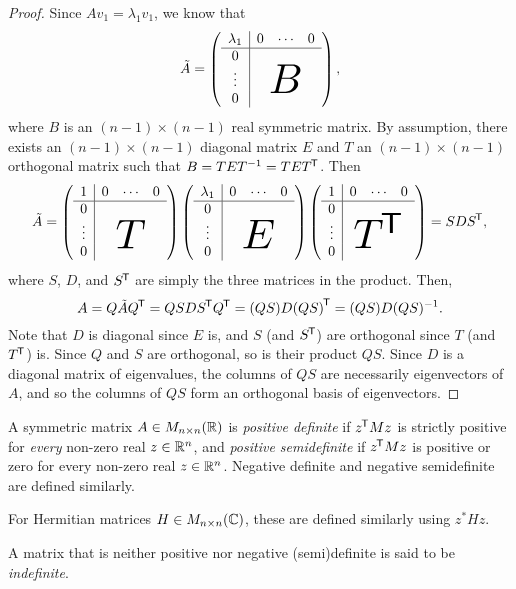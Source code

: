 \begin{proof}
    Since $Av_1 = \lambda_1v_1$, we know that
    \[\tilde{A} = \left(\begin{array}{c|ccc}
        \lambda_1 & 0 & \cdots & 0 \\
        \hline
        0 & & & \\
        \vdots & & & \\
        0 & \largeblock{3}{2.2}{$B$}
    \end{array}\right),\]
    where $B$ is an $(n-1)\times(n-1)$ real symmetric matrix. By assumption, there exists an $(n-1)\times(n-1)$ diagonal matrix $E$ and $T$ an $(n-1)\times(n-1)$ orthogonal matrix such that $B = TET^{-1} = TE{T}^{\mkern-1.5mu\mathsf{T}}$. Then
    \[\tilde{A} = \left(\begin{array}{c|ccc}
        1 & 0 & \cdots & 0 \\
        \hline
        0 & & & \\
        \vdots & & & \\
        0 & \largeblock{3}{2.0}{$T$}
    \end{array}\right)
    \left(\begin{array}{c|ccc}
        \lambda_1 & 0 & \cdots & 0 \\
        \hline
        0 & & & \\
        \vdots & & & \\
        0 & \largeblock{3}{2.0}{$E$}
    \end{array}\right)
    \left(\begin{array}{c|ccc}
        1 & 0 & \cdots & 0 \\
        \hline
        0 & & & \\
        \vdots & & & \\
        0 & \largeblock{3}{2.7}{$\transposeof{T}$}
    \end{array}\right) = SD\transposeof{S},\]
    where $S$, $D$, and ${S}^{\mkern-1.5mu\mathsf{T}}$ are simply the three matrices in the product. Then,
    \[A = Q\tilde{A}{Q}^{\mkern-1.5mu\mathsf{T}} = QSD{S}^{\mkern-1.5mu\mathsf{T}}{Q}^{\mkern-1.5mu\mathsf{T}} = (QS)D{(QS)}^{\mkern-1.5mu\mathsf{T}} = (QS)D(QS)^{-1}.\]
    Note that $D$ is diagonal since $E$ is, and $S$ (and ${S}^{\mkern-1.5mu\mathsf{T}}$) are orthogonal since $T$ (and ${T}^{\mkern-1.5mu\mathsf{T}}$) is. Since $Q$ and $S$ are orthogonal, so is their product $QS$. Since $D$ is a diagonal matrix of eigenvalues, the columns of $QS$ are necessarily eigenvectors of $A$, and so the columns of $QS$ form an orthogonal basis of eigenvectors.
\end{proof}

\begin{defn}
    A symmetric matrix $A \in M_{n\times n}(\mathbb{R})$ is \emph{positive definite} if ${z}^{\mkern-1.5mu\mathsf{T}}Mz$ is strictly positive for \emph{every} non-zero real $z \in \mathbb{R}^n$, and \emph{positive semidefinite} if ${z}^{\mkern-1.5mu\mathsf{T}}Mz$ is positive or zero for every non-zero real $z \in \mathbb{R}^n$. Negative definite and negative semidefinite are defined similarly.
    
    For Hermitian matrices $H \in M_{n\times n}(\mathbb{C})$, these are defined similarly using $z^{*}Hz$.

    A matrix that is neither positive nor negative (semi)definite is said to be \emph{indefinite}.
\end{defn}

